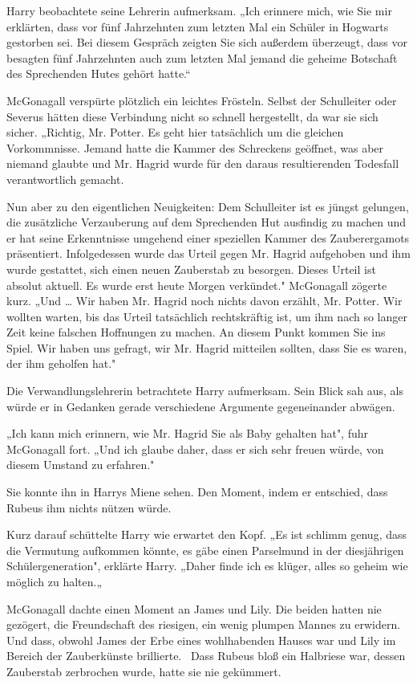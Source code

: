 {Harry beobachtete seine Lehrerin aufmerksam. „Ich erinnere mich, wie Sie mir erklärten, dass vor fünf Jahrzehnten zum letzten Mal ein Schüler in Hogwarts gestorben sei. Bei diesem Gespräch zeigten Sie sich außerdem überzeugt, dass vor besagten fünf Jahrzehnten auch zum letzten Mal jemand die geheime Botschaft des Sprechenden Hutes gehört hatte.“

McGonagall verspürte plötzlich ein leichtes Frösteln. Selbst der Schulleiter oder Severus hätten diese Verbindung nicht so schnell hergestellt, da war sie sich sicher. „Richtig, Mr. Potter. Es geht hier tatsächlich um die gleichen Vorkommnisse. Jemand hatte die Kammer des Schreckens geöffnet, was aber niemand glaubte und Mr. Hagrid wurde für den daraus resultierenden Todesfall verantwortlich gemacht.

Nun aber zu den eigentlichen Neuigkeiten: Dem Schulleiter ist es jüngst gelungen, die zusätzliche Verzauberung auf dem Sprechenden Hut ausfindig zu machen und er hat seine Erkenntnisse umgehend einer speziellen Kammer des Zauberergamots präsentiert. Infolgedessen wurde das Urteil gegen Mr. Hagrid aufgehoben und ihm wurde gestattet, sich einen neuen Zauberstab zu besorgen. Dieses Urteil ist absolut aktuell. Es wurde erst heute Morgen verkündet." McGonagall zögerte kurz. „Und … Wir haben Mr. Hagrid noch nichts davon erzählt, Mr. Potter. Wir wollten warten, bis das Urteil tatsächlich rechtskräftig ist, um ihm nach so langer Zeit keine falschen Hoffnungen zu machen. An diesem Punkt kommen Sie ins Spiel. Wir haben uns gefragt, wir Mr. Hagrid mitteilen sollten, dass Sie es waren, der ihm geholfen hat."

Die Verwandlungslehrerin betrachtete Harry aufmerksam. Sein Blick sah aus, als würde er in Gedanken gerade verschiedene Argumente gegeneinander abwägen.

„Ich kann mich erinnern, wie Mr. Hagrid Sie als Baby gehalten hat", fuhr McGonagall fort. „Und ich glaube daher, dass er sich sehr freuen würde, von diesem Umstand zu erfahren."

Sie konnte ihn in Harrys Miene sehen. Den Moment, indem er entschied, dass Rubeus ihm nichts nützen würde.

Kurz darauf schüttelte Harry wie erwartet den Kopf. „Es ist schlimm genug, dass die Vermutung aufkommen könnte, es gäbe einen Parselmund in der diesjährigen Schülergeneration", erklärte Harry. „Daher finde ich es klüger, alles so geheim wie möglich zu halten.„

McGonagall dachte einen Moment an James und Lily. Die beiden hatten nie gezögert, die Freundschaft des riesigen, ein wenig plumpen Mannes zu erwidern. Und dass, obwohl James der Erbe eines wohlhabenden Hauses war und Lily im Bereich der Zauberkünste brillierte. ~Dass Rubeus bloß ein Halbriese war, dessen Zauberstab zerbrochen wurde, hatte sie nie gekümmert.

}
